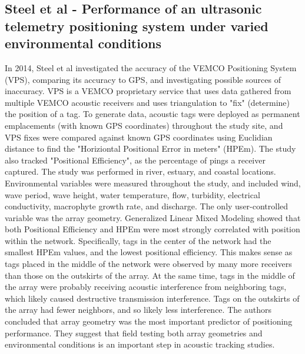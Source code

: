\subsection {Steel et al - Performance of an ultrasonic telemetry positioning system under varied environmental conditions}
In 2014, Steel et al\cite{Steel2014} investigated the accuracy of the VEMCO Positioning System (VPS), comparing its accuracy to GPS, and investigating possible sources of inaccuracy.  VPS is a VEMCO proprietary service that uses data gathered from multiple VEMCO acoustic receivers and uses triangulation to "fix" (determine) the position of a tag.  To generate data, acoustic tags were deployed as permanent emplacements (with known GPS coordinates) throughout the study site, and VPS fixes were compared against known GPS coordinates using Euclidian distance to find the "Horiziontal Positional Error in meters" (HPEm).  The study also tracked "Positional Efficiency", as the percentage of pings a receiver captured.  The study was performed in river, estuary, and coastal locations.  Environmental variables were measured throughout the study, and included wind, wave period, wave height, water temperature, flow, turbidity, electrical conductivity, macrophyte growth rate, and discharge.  The only user-controlled variable was the array geometry.  Generalized Linear Mixed Modeling showed that both Positional Efficiency and HPEm were most strongly correlated with position within the network.  Specifically, tags in the center of the network had the smallest HPEm values, and the lowest positional efficiency.  This makes sense as tags placed in the middle of the network were observed by many more receivers than those on the outskirts of the array.  At the same time, tags in the middle of the array were probably receiving acoustic interference from neighboring tags, which likely caused destructive transmission interference.  Tags on the outskirts of the array had fewer neighbors, and so likely less interference.  The authors concluded that array geometry was the most important predictor of positioning performance. They suggest that field testing both array geometries and environmental conditions is an important step in acoustic tracking studies.



